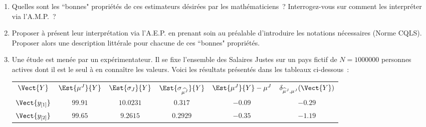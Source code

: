 \documentclass[10pt]{report}
\begin{document}
\begin{exercice}
\begin{enumerate}
\item Quelles sont les ``bonnes" propriétés de ces estimateurs désirées par les mathématiciens~?
Interrogez-vous sur comment les interpréter via l'A.M.P.~?  
\item Proposer à présent leur interprétation via l'A.E.P. en prenant soin au préalable
d'introduire les notations nécessaires (Norme CQLS). Proposer alors une description littérale pour chacune de ces ``bonnes" propriétés.
\item Une étude est menée par un expérimentateur.  Il se fixe l'ensemble des Salaires Justes sur un pays fictif de $N=1000000$ personnes actives dont il est le seul à en connaître les valeurs. Voici les résultats présentés dans les tableaux ci-dessous~:\\   
\begin{center}\begin{tabular}{c|ccccc}
        $\Vect{Y}$
         & 
    
        $\Est{\mu^{J}}{Y}$
         & 
    
        $\Est{\sigma_{J}}{Y}$
         & 
    
        $\Est{\sigma_{\widehat{\mu^{J}}}}{Y}$
         & 
    
        $\Est{\mu^{J}}{Y}-\mu^{J}$
         & 
    
        $\delta_{\widehat\mu^{J},\mu^{J}}(\Vect{Y})$
        
    \\ \cline{1-6}

    
        $\Vect{y_{[1]}}$
         & 
    
        $99.91$
         & 
    
        $10.0231$
         & 
    
        $0.317$
         & 
    
        $-0.09$
         & 
    
        $-0.29$
        
    \\ 

    
        $\Vect{y_{[2]}}$
         & 
    
        $99.65$
         & 
    
        $9.2615$
         & 
    
        $0.2929$
         & 
    
        $-0.35$
         & 
    
        $-1.19$
        
    \\ 


\end{tabular}
\end{center}
\end{enumerate}
\end{exercice}
\end{document}
